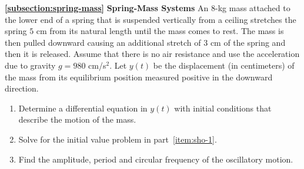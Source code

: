 \begin{Exercise}[title={Mixed Spring Mass and Electrical Network Systems}]\label{EX36}
	
\noindent\textbf{\ref{subsection:spring-mass}} \textbf{\large Spring-Mass Systems}
	\Question\label{3-6-1}
An $8$-kg mass attached to the lower end of a spring that is suspended vertically from a ceiling stretches the spring $5$ cm from its natural length until the mass comes to rest. The mass is then pulled downward causing an additional stretch of $3$ cm of the spring  and then it is released. Assume that there is no air resistance and use the acceleration due to gravity  \(g = 980\) cm/s\(^2\). Let \(y(t)\) be the displacement (in centimeters) of the mass from its equilibrium position measured  positive in the downward direction.
\begin{enumerate}[label =\textbf{\roman*.}, noitemsep]
	\item\label{item:sho-1} Determine a differential equation in $y(t)$ with  initial conditions that describe the motion of the mass.
	\item Solve for the initial value problem in part~\ref{item:sho-1}.
	\item Find the amplitude, period and circular frequency of the oscillatory motion.
\end{enumerate}
	

\end{Exercise}
